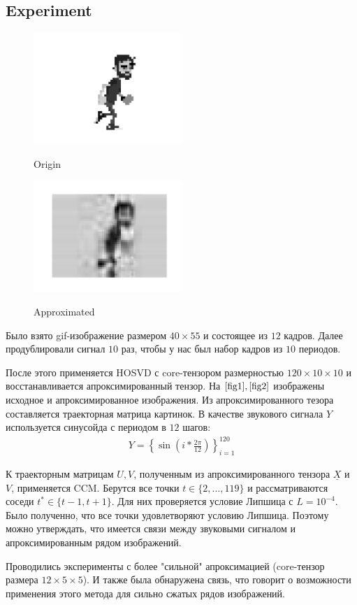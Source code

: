 \documentclass[../../main.tex]{subfiles}
\begin{document}
\subsection{Experiment}

\begin{figure}[h]
  \begin{multicols}{2}
    \hfill
    \includegraphics[width=0.5\textwidth]{./figures/origin.pdf}
    \hfill
    \caption{Origin}
    \label{fig1}
    \hfill
    \includegraphics[width=0.5\textwidth]{./figures/approx.pdf}
    \hfill
    \caption{Approximated}
    \label{fig2}
  \end{multicols}
\end{figure}

Было взято gif-изображение размером $40 \times 55$ и состоящее из $12$ кадров. 
Далее продублировали сигнал $10$ раз, чтобы у нас был набор кадров из $10$ периодов. 

После этого применяется HOSVD с core-тензором размерностью $120 \times 10 \times 10$ и восстанавливается апроксимированный тензор. На $\ref{fig1}, \ref{fig2}$ изображены исходное и апроксимированное изображения. 
Из апроксимированного тезора составляется траекторная матрица картинок. 
В качестве звукового сигнала $Y$ используется синусойда с периодом в $12$ шагов:
\begin{gather*}
    Y = \left\{\sin\left(i * \frac{2 \pi}{12}\right) \right\}_{i=1}^{120}
\end{gather*}

К траекторным матрицам $U, V$, полученным из апроксимированного тензора $\underline{X}$ и $V$, применяется CCM. 
Берутся все точки $t \in \{2, \dots, 119\}$ и рассматриваются соседи $t^* \in \{t-1, t+1\}$.
Для них проверяется условие Липшица с $L=10^{-4}$. 
Было полученно, что все точки удовлетворяют условию Липшица. 
Поэтому можно утверждать, что имеется связи между звуковыми сигналом и апроксимированным рядом изображений. 

Проводились эксперименты с более "сильной" апроксимацией (core-тензор размера $12 \times 5 \times 5$). 
И также была обнаружена связь, что говорит о возможности применения этого метода для сильно сжатых рядов изображений. 
\end{document}
